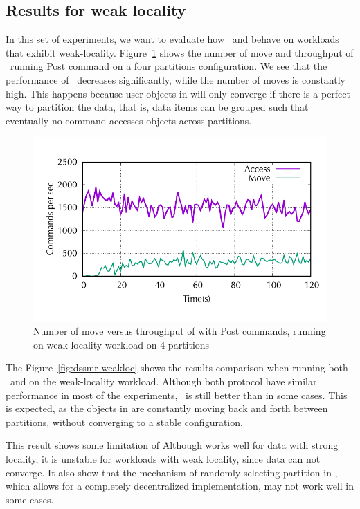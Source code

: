\subsection{Results for weak locality} \label{sec:dssmr-evaluation:weakloc}


In this set of experiments, we want to evaluate how \dssmr\ and \ssmr behave on
workloads that exhibit weak-locality. Figure~\ref{fig:dssmr-move-vs-tp-weak}
shows the number of move and throughput of \dssmr\ running Post command on a
four partitions configuration. We see that the performance of \dssmr\ decreases
significantly, while the number of moves is constantly high. This happens
because user objects in \dssmr{} will only converge if there is a perfect way to
partition the data, that is, data items can be grouped such that eventually no
command accesses objects across partitions. 

\begin{figure}[ht!]
\begin{minipage}[b]{1\linewidth}
\centering
      \includegraphics[width=0.6\linewidth]{figures/experiments/dssmr/move-vs-throughput-weak}
\end{minipage}
\caption{Number of move versus throughput of \dynastar with Post commands, running on weak-locality workload on 4 partitions}
\label{fig:dssmr-move-vs-tp-weak}
\end{figure}

The Figure~\ref{fig:dssmr-weakloc} shows the results comparison when running
both \dssmr\ and \ssmr on the weak-locality workload. Although both protocol
have similar performance in most of the experiments, \ssmr\ is still better than
\dssmr in some cases. This is expected, as the objects in \dssmr are constantly
moving back and forth between partitions, without converging to a stable
configuration.

This result shows some limitation of \dssmr\. Although \dssmr works well for
data with strong locality, it is unstable for workloads with weak locality,
since data can not converge. It also show that the mechanism of randomly
selecting partition in \dssmr, which allows for a completely decentralized
implementation, may not work well in some cases.

